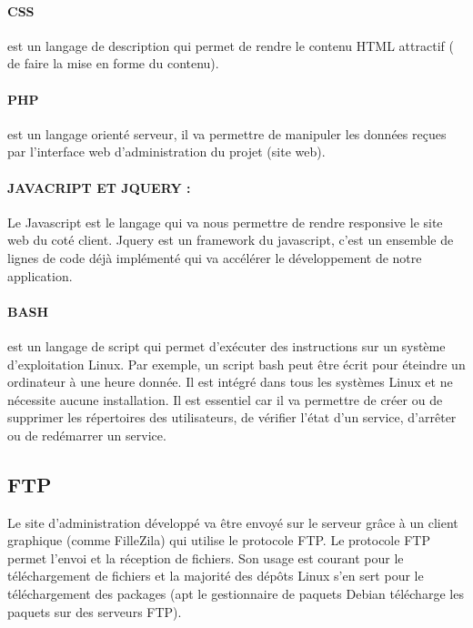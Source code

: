 \documentclass[a4paper,12pt,french]{report} %
\begin{document}
\paragraph{CSS} est un langage de description qui permet de rendre le contenu HTML attractif ( de faire la mise en forme du contenu).
\paragraph{PHP} est un langage orienté serveur, il va permettre de manipuler les données reçues par l'interface web d'administration du projet (site web).
\paragraph{JAVACRIPT ET JQUERY :} Le Javascript est le langage qui va nous permettre de rendre responsive le site web du coté client. Jquery est un framework du javascript, c'est un ensemble de lignes de code déjà implémenté qui va accélérer le développement de notre application.
\paragraph{BASH} est un langage de script qui permet d'exécuter des instructions sur un système d'exploitation Linux. Par exemple, un script bash peut être écrit pour éteindre un ordinateur à une heure donnée. Il est intégré dans tous les systèmes Linux et ne nécessite aucune installation. Il est essentiel car il va permettre de créer ou de supprimer les répertoires des utilisateurs, de vérifier l'état d'un service, d'arrêter ou de redémarrer un service.

\subsection{FTP} 
Le site d'administration développé va être envoyé sur le serveur grâce à un client graphique (comme FilleZila) qui utilise le protocole FTP. Le protocole FTP permet l'envoi et la réception de fichiers. Son usage est courant pour le téléchargement de fichiers et la majorité des dépôts Linux s'en sert pour le téléchargement des packages (apt le gestionnaire de paquets Debian télécharge les paquets sur des serveurs FTP).
\end{document}
